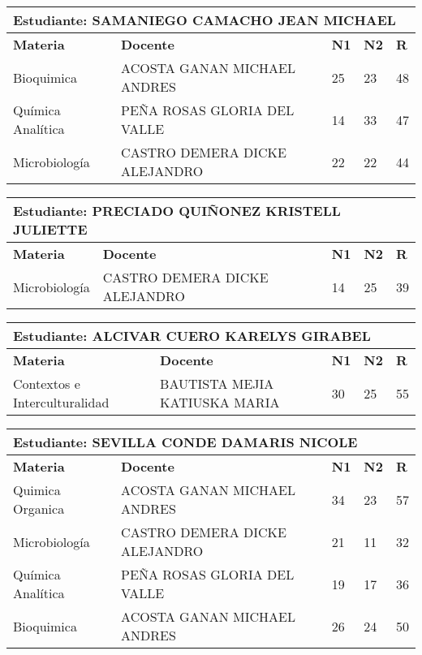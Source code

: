 \small
\begin{tabularx}{\textwidth}{|p{5cm}|p{7cm}|X|X|X|}
\hline
\multicolumn{5}{|p{\dimexpr\textwidth-2\tabcolsep-2\arrayrulewidth}|}{\textbf{Estudiante: SAMANIEGO CAMACHO JEAN MICHAEL }}\\\hline
\textbf{Materia} & \textbf{Docente} & \textbf{N1} & \textbf{N2} & \textbf{R} \\ \hline
Bioquimica & ACOSTA GANAN MICHAEL ANDRES  & 25 & 23& 48 \\ \hline
Química Analítica & PEÑA ROSAS GLORIA DEL VALLE  & 14 & 33& 47 \\ \hline
Microbiología & CASTRO DEMERA DICKE ALEJANDRO  & 22 & 22& 44 \\ \hline
\end{tabularx}\vspace{10mm}
\small
\begin{tabularx}{\textwidth}{|p{5cm}|p{7cm}|X|X|X|}
\hline
\multicolumn{5}{|p{\dimexpr\textwidth-2\tabcolsep-2\arrayrulewidth}|}{\textbf{Estudiante: PRECIADO QUIÑONEZ KRISTELL JULIETTE }}\\\hline
\textbf{Materia} & \textbf{Docente} & \textbf{N1} & \textbf{N2} & \textbf{R} \\ \hline
Microbiología & CASTRO DEMERA DICKE ALEJANDRO  & 14 & 25& 39 \\ \hline
\end{tabularx}\vspace{10mm}
\small
\begin{tabularx}{\textwidth}{|p{5cm}|p{7cm}|X|X|X|}
\hline
\multicolumn{5}{|p{\dimexpr\textwidth-2\tabcolsep-2\arrayrulewidth}|}{\textbf{Estudiante: ALCIVAR CUERO KARELYS GIRABEL }}\\\hline
\textbf{Materia} & \textbf{Docente} & \textbf{N1} & \textbf{N2} & \textbf{R} \\ \hline
Contextos e Interculturalidad & BAUTISTA MEJIA KATIUSKA MARIA  & 30 & 25& 55 \\ \hline
\end{tabularx}\vspace{10mm}
\small
\begin{tabularx}{\textwidth}{|p{5cm}|p{7cm}|X|X|X|}
\hline
\multicolumn{5}{|p{\dimexpr\textwidth-2\tabcolsep-2\arrayrulewidth}|}{\textbf{Estudiante: SEVILLA CONDE DAMARIS NICOLE }}\\\hline
\textbf{Materia} & \textbf{Docente} & \textbf{N1} & \textbf{N2} & \textbf{R} \\ \hline
Quimica Organica & ACOSTA GANAN MICHAEL ANDRES  & 34 & 23& 57 \\ \hline
Microbiología & CASTRO DEMERA DICKE ALEJANDRO  & 21 & 11& 32 \\ \hline
Química Analítica & PEÑA ROSAS GLORIA DEL VALLE  & 19 & 17& 36 \\ \hline
Bioquimica & ACOSTA GANAN MICHAEL ANDRES  & 26 & 24& 50 \\ \hline
\end{tabularx}\vspace{10mm}

